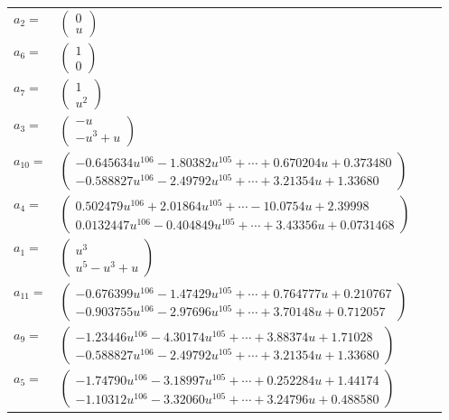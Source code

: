 \documentclass[1p]{elsarticle_modified}
\theoremstyle{definition}
\begin{document}
\begin{tabular}{m{7pt} m{180pt} m{7pt} m{180pt} }
\flushright $a_{2}=$&$\begin{pmatrix}0\\u\end{pmatrix}$ \\
\flushright $a_{6}=$&$\begin{pmatrix}1\\0\end{pmatrix}$ \\
\flushright $a_{7}=$&$\begin{pmatrix}1\\u^2\end{pmatrix}$ \\
\flushright $a_{3}=$&$\begin{pmatrix}- u\\- u^3+u\end{pmatrix}$ \\
\flushright $a_{10}=$&$\begin{pmatrix}-0.645634 u^{106}-1.80382 u^{105}+\cdots+0.670204 u+0.373480\\-0.588827 u^{106}-2.49792 u^{105}+\cdots+3.21354 u+1.33680\end{pmatrix}$ \\
\flushright $a_{4}=$&$\begin{pmatrix}0.502479 u^{106}+2.01864 u^{105}+\cdots-10.0754 u+2.39998\\0.0132447 u^{106}-0.404849 u^{105}+\cdots+3.43356 u+0.0731468\end{pmatrix}$ \\
\flushright $a_{1}=$&$\begin{pmatrix}u^3\\u^5- u^3+u\end{pmatrix}$ \\
\flushright $a_{11}=$&$\begin{pmatrix}-0.676399 u^{106}-1.47429 u^{105}+\cdots+0.764777 u+0.210767\\-0.903755 u^{106}-2.97696 u^{105}+\cdots+3.70148 u+0.712057\end{pmatrix}$ \\
\flushright $a_{9}=$&$\begin{pmatrix}-1.23446 u^{106}-4.30174 u^{105}+\cdots+3.88374 u+1.71028\\-0.588827 u^{106}-2.49792 u^{105}+\cdots+3.21354 u+1.33680\end{pmatrix}$ \\
\flushright $a_{5}=$&$\begin{pmatrix}-1.74790 u^{106}-3.18997 u^{105}+\cdots+0.252284 u+1.44174\\-1.10312 u^{106}-3.32060 u^{105}+\cdots+3.24796 u+0.488580\end{pmatrix}$ \\

\end{tabular}
\end{document}
